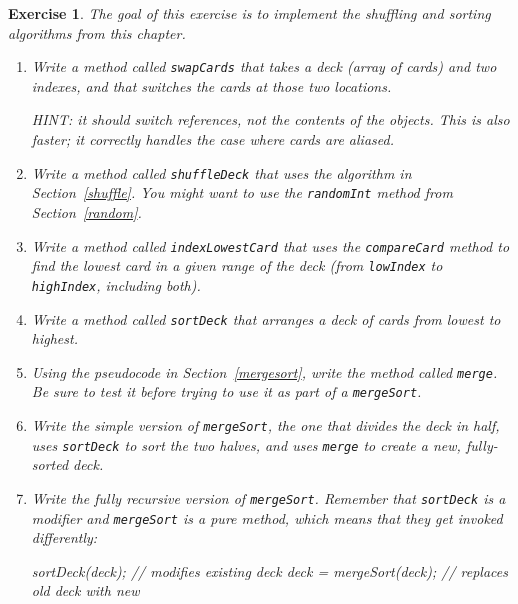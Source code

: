 \documentclass[12pt]{book}
\theoremstyle{exercise}
\newtheorem{exercise}{Exercise}[chapter]
\newcommand{\java}[1]{\verb"#1"}
\newcommand{\java}[1]{\lstinline{#1}} %
\begin{document}
\begin{exercise}
The goal of this exercise is to implement the shuffling and sorting algorithms from this chapter.

\begin{enumerate}



\item Write a method called \java{swapCards} that takes a deck (array of cards) and two indexes, and that switches the cards at those two locations.

HINT: it should switch references, not the contents of the objects.
This is also faster; it correctly handles the case where cards are aliased.

\item Write a method called \java{shuffleDeck} that uses the algorithm in Section~\ref{shuffle}.
You might want to use the \java{randomInt} method from Section~\ref{random}.

\item Write a method called \java{indexLowestCard} that uses the \java{compareCard} method to find the lowest card in a given range of the deck (from \java{lowIndex} to \java{highIndex}, including both).

\item Write a method called \java{sortDeck} that arranges a deck of cards from lowest to highest.

\item Using the pseudocode in Section~\ref{mergesort}, write the method called \java{merge}.
Be sure to test it before trying to use it as part of a \java{mergeSort}.

\item Write the simple version of \java{mergeSort}, the one that divides the deck in half, uses \java{sortDeck} to sort the two halves, and uses \java{merge} to create a new, fully-sorted deck.

\item Write the fully recursive version of \java{mergeSort}.
Remember that \java{sortDeck} is a modifier and \java{mergeSort} is a pure method, which means that they get invoked differently:

\begin{code}
sortDeck(deck);              // modifies existing deck
deck = mergeSort(deck);      // replaces old deck with new
\end{code}

\end{enumerate}
\end{exercise}


\backmatter
\appendix

%
%
%
%

\printindex
\cleardoublepage
\end{document}
